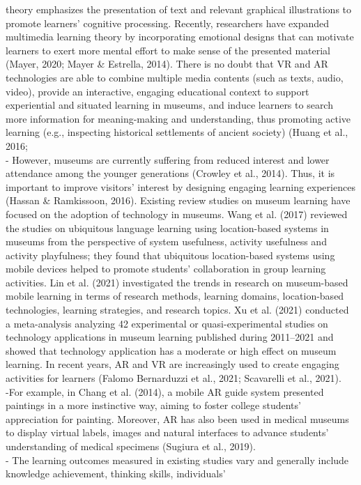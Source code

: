 theory emphasizes the presentation of text and relevant graphical illustrations to promote learners’ cognitive processing. Recently,
researchers have expanded multimedia learning theory by incorporating emotional designs that can motivate learners to exert more
mental effort to make sense of the presented material (Mayer, 2020; Mayer & Estrella, 2014). There is no doubt that VR and AR
technologies are able to combine multiple media contents (such as texts, audio, video), provide an interactive, engaging educational
context to support experiential and situated learning in museums, and induce learners to search more information for meaning-making
and understanding, thus promoting active learning (e.g., inspecting historical settlements of ancient society) (Huang et al., 2016;
\\
- However, museums are currently suffering from reduced interest and lower attendance among the younger generations (Crowley
et al., 2014). Thus, it is important to improve visitors’ interest by designing engaging learning experiences (Hassan & Ramkissoon,
2016). Existing review studies on museum learning have focused on the adoption of technology in museums. Wang et al. (2017)
reviewed the studies on ubiquitous language learning using location-based systems in museums from the perspective of system usefulness,
activity usefulness and activity playfulness; they found that ubiquitous location-based systems using mobile devices helped to
promote students’ collaboration in group learning activities. Lin et al. (2021) investigated the trends in research on museum-based
mobile learning in terms of research methods, learning domains, location-based technologies, learning strategies, and research
topics. Xu et al. (2021) conducted a meta-analysis analyzing 42 experimental or quasi-experimental studies on technology applications
in museum learning published during 2011–2021 and showed that technology application has a moderate or high effect on museum
learning. In recent years, AR and VR are increasingly used to create engaging activities for learners (Falomo Bernarduzzi et al., 2021;
Scavarelli et al., 2021).
\\
-For example, in Chang et al. (2014), a
mobile AR guide system presented paintings in a more instinctive way, aiming to foster college students’ appreciation for painting.
Moreover, AR has also been used in medical museums to display virtual labels, images and natural interfaces to advance students’
understanding of medical specimens (Sugiura et al., 2019).
\\
- The learning outcomes measured in existing studies vary and generally include knowledge achievement, thinking skills, individuals’
